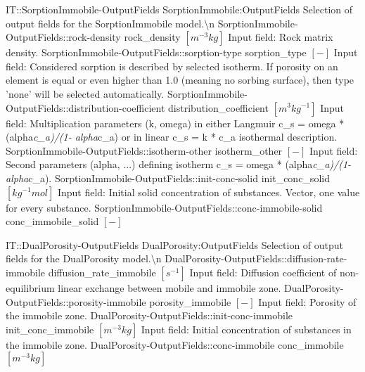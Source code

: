 \begin{SelectionType}
	{IT::SorptionImmobile-OutputFields}
	{SorptionImmobile:OutputFields}
	{{{Selection of output fields for the SorptionImmobile model.{\textbackslash}n}%
}}
		\SelectionItem
			{SorptionImmobile-OutputFields::rock-density}
			{rock{\_}density}
			{{{}{$[m^{-3}kg]$}{ Input field: Rock matrix density.}%
}}
		\SelectionItem
			{SorptionImmobile-OutputFields::sorption-type}
			{sorption{\_}type}
			{{{}{$[-]$}{ Input field: Considered sorption is described by selected isotherm.
If porosity on an element is equal or even higher than 1.0 (meaning no sorbing surface), then type 'none' will be selected automatically.}%
}}
		\SelectionItem
			{SorptionImmobile-OutputFields::distribution-coefficient}
			{distribution{\_}coefficient}
			{{{}{$[m^{3}kg^{-1}]$}{ Input field: Multiplication parameters (k, omega) in either Langmuir c{\_}s = omega * (alpha}\textit{c{\_}a)/(1- alpha}{c{\_}a) or in linear c{\_}s = k * c{\_}a isothermal description.}%
}}
		\SelectionItem
			{SorptionImmobile-OutputFields::isotherm-other}
			{isotherm{\_}other}
			{{{}{$[-]$}{ Input field: Second parameters (alpha, ...) defining isotherm  c{\_}s = omega * (alpha}\textit{c{\_}a)/(1- alpha}{c{\_}a).}%
}}
		\SelectionItem
			{SorptionImmobile-OutputFields::init-conc-solid}
			{init{\_}conc{\_}solid}
			{{{}{$[kg^{-1}mol]$}{ Input field: Initial solid concentration of substances.
Vector, one value for every substance.}%
}}
		\SelectionItem
			{SorptionImmobile-OutputFields::conc-immobile-solid}
			{conc{\_}immobile{\_}solid}
			{{{}{$[-]$}{ }%
}}
\end{SelectionType}
\begin{SelectionType}
	{IT::DualPorosity-OutputFields}
	{DualPorosity:OutputFields}
	{{{Selection of output fields for the DualPorosity model.{\textbackslash}n}%
}}
		\SelectionItem
			{DualPorosity-OutputFields::diffusion-rate-immobile}
			{diffusion{\_}rate{\_}immobile}
			{{{}{$[s^{-1}]$}{ Input field: Diffusion coefficient of non-equilibrium linear exchange between mobile and immobile zone.}%
}}
		\SelectionItem
			{DualPorosity-OutputFields::porosity-immobile}
			{porosity{\_}immobile}
			{{{}{$[-]$}{ Input field: Porosity of the immobile zone.}%
}}
		\SelectionItem
			{DualPorosity-OutputFields::init-conc-immobile}
			{init{\_}conc{\_}immobile}
			{{{}{$[m^{-3}kg]$}{ Input field: Initial concentration of substances in the immobile zone.}%
}}
		\SelectionItem
			{DualPorosity-OutputFields::conc-immobile}
			{conc{\_}immobile}
			{{{}{$[m^{-3}kg]$}{ }%
}}
\end{SelectionType}
